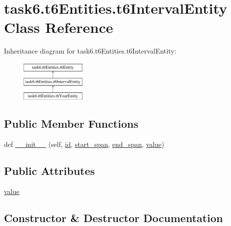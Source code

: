 \hypertarget{classtask6_1_1t6Entities_1_1t6IntervalEntity}{}\section{task6.\+t6\+Entities.\+t6\+Interval\+Entity Class Reference}
\label{classtask6_1_1t6Entities_1_1t6IntervalEntity}
Inheritance diagram for task6.\+t6\+Entities.\+t6\+Interval\+Entity\+:\begin{figure}[H]
\begin{center}
\leavevmode
\includegraphics[height=2.000000cm]{classtask6_1_1t6Entities_1_1t6IntervalEntity}
\end{center}
\end{figure}
\subsection*{Public Member Functions}
\begin{DoxyCompactItemize}
\item 
def \hyperlink{classtask6_1_1t6Entities_1_1t6IntervalEntity_a1ac32d786c2759c6886bcde28846eb0d}{\+\_\+\+\_\+init\+\_\+\+\_\+} (self, \hyperlink{classtask6_1_1t6Entities_1_1t6Entity_a96b2e7fb553c920ab2db6f6deb31e3b4}{id}, \hyperlink{classtask6_1_1t6Entities_1_1t6Entity_a8221c36d2995a24200cdfbd74cc9233c}{start\+\_\+span}, \hyperlink{classtask6_1_1t6Entities_1_1t6Entity_a597d42bb02fc9f42277098f0ce21917c}{end\+\_\+span}, \hyperlink{classtask6_1_1t6Entities_1_1t6IntervalEntity_a002714e201e05948aca8cce83d4a9da6}{value})
\end{DoxyCompactItemize}
\subsection*{Public Attributes}
\begin{DoxyCompactItemize}
\item 
\hyperlink{classtask6_1_1t6Entities_1_1t6IntervalEntity_a002714e201e05948aca8cce83d4a9da6}{value}
\end{DoxyCompactItemize}


\subsection{Constructor \& Destructor Documentation}
\mbox{\label{classtask6_1_1t6Entities_1_1t6IntervalEntity_a1ac32d786c2759c6886bcde28846eb0d}} 
